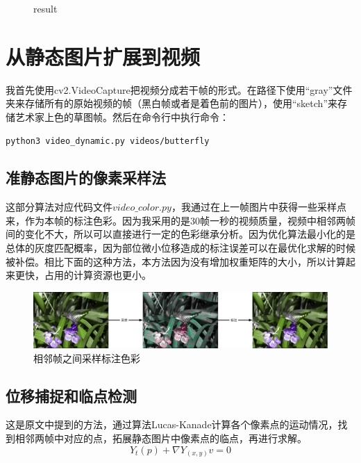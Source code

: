 \documentclass{article}
\begin{document}
\begin{figure}[H]
{\begin{minipage}[t]{0.3\linewidth}
\caption{result}
\end{minipage}
}%
\centering
\end{figure}

\section{从静态图片扩展到视频}
我首先使用cv2.VideoCapture把视频分成若干帧的形式。在路径下使用“gray”文件夹来存储所有的原始视频的帧（黑白帧或者是着色前的图片），使用“sketch”来存储艺术家上色的草图帧。然后在命令行中执行命令：

\begin{lstlisting}[language=bash]
 python3 video_dynamic.py videos/butterfly
\end{lstlisting}

\subsection{准静态图片的像素采样法}
这部分算法对应代码文件$video\_color.py$，我通过在上一帧图片中获得一些采样点来，作为本帧的标注色彩。因为我采用的是30帧一秒的视频质量，视频中相邻两帧间的变化不大，所以可以直接进行一定的色彩继承分析。因为优化算法最小化的是总体的灰度匹配概率，因为部位微小位移造成的标注误差可以在最优化求解的时候被补偿。相比下面的这种方法，本方法因为没有增加权重矩阵的大小，所以计算起来更快，占用的计算资源也更小。

\begin{figure}[H]
\centering
\includegraphics[scale=0.3]{seq.pdf}
\caption{相邻帧之间采样标注色彩}
\end{figure}

\subsection{位移捕捉和临点检测}
这是原文中提到的方法，通过算法Lucas-Kanade计算各个像素点的运动情况，找到相邻两帧中对应的点，拓展静态图片中像素点的临点，再进行求解。
\begin{equation}
Y_t(p) +  \nabla Y_{(x, y)} v = 0
\end{equation}
\end{document}
